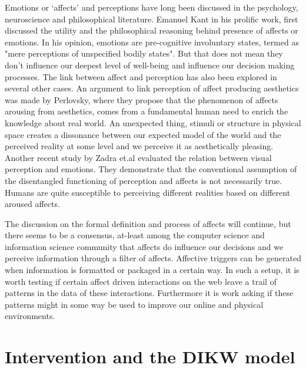 Emotions or `affects' and perceptions have long been discussed in the psychology, neuroscience and philosophical literature. Emanuel Kant in his prolific work, first discussed the utility and the philosophical reasoning behind presence of affects or emotions\cite{kant1987critique}. In his opinion, emotions are pre-cognitive involuntary states, termed as "mere perceptions of unspecified bodily states"\cite{borges2004can}. But that does not mean they don't influence our deepest level of well-being and influence our decision making processes.
The link between affect and perception has also been explored in several other cases. An argument to link perception of affect producing aesthetics was made by Perlovsky\cite{perlovsky2014aesthetic}, where they propose that the phenomenon of affects arousing from aesthetics, comes from a fundamental human need to enrich the knowledge about real world. An unexpected thing, stimuli or structure in physical space creates a dissonance between our expected model of the world and the perceived reality at some level and we perceive it as aesthetically pleasing. Another recent study by Zadra et.al\cite{zadra2011emotion} evaluated the relation between visual perception and emotions. They demonstrate that the conventional assumption of the disentangled functioning of perception and affects is not necessarily true. Humans are quite susceptible to perceiving different realities based on different aroused affects. 

The discussion on the formal definition and process of affects will continue, but there seems to be a consensus, at-least among the computer science and information science community that affects do influence our decisions and we perceive information through a filter of affects. Affective triggers can be generated when information is formatted or packaged in a certain way. In such a setup, it is worth testing if certain affect driven interactions on the web leave a trail of patterns in the data of these interactions. Furthermore it is work asking if these patterns might in some way be used to improve our online and physical environments.

\section{Intervention and the DIKW model}


